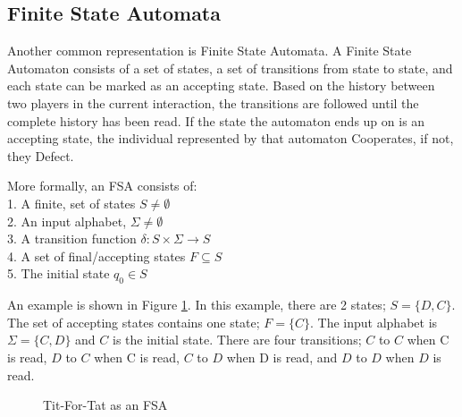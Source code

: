 \documentclass[a4paper,11pt,bcshonoursthesis,singlespace,oneside,thesisdraft,pdflatex]{cssethesis}
\begin{document}

\subsection{Finite State Automata}
\label{sec:fsa}
Another common representation is Finite State Automata. 
A Finite State Automaton consists of a set of states, a set of transitions from state to state, and each state can be marked as an accepting state. 
Based on the history between two players in the current interaction, the transitions are followed until the complete history has been read. 
If the state the automaton ends up on is an accepting state, the individual represented by that automaton Cooperates, if not, they Defect. 

More formally, an FSA consists of:\\
1. A finite, set of states $S \neq  \emptyset$\\
2. An input alphabet, $\Sigma \neq  \emptyset$\\
3. A transition function $\delta : S \times \Sigma \rightarrow S$\\
4. A set of final/accepting states $F \subseteq S$ \\
5. The initial state $q_0 \in S$

An example is shown in Figure \ref{fig:fsa.tft.lang2}. 
In this example, there are 2 states; $S=\{D,C\}$. 
The set of accepting states contains one state; $F=\{C\}$. 
The input alphabet is $\Sigma=\{C,D\}$ and $C$ is the initial state. 
There are four transitions; $C$ to $C$ when C is read, $D$ to $C$ when C is read, $C$ to $D$ when D is read, and $D$ to $D$ when $D$ is read.

\begin{figure}[h]
\center
{}
\caption{Tit-For-Tat as an FSA}
\label{fig:fsa.tft.lang2}
\end{figure}
\end{document}
